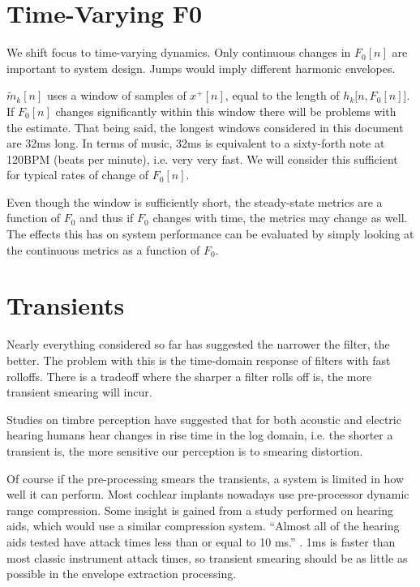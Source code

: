 \documentclass [11pt, proquest,oneside] {ganter_thesis}[2015/03/03]
\begin{document}

\section{Time-Varying F0}

We shift focus to time-varying dynamics.  Only continuous changes in $F_0[n]$ are important to system design.  Jumps would imply different harmonic envelopes.

$\tilde{m}_k[n]$ uses a window of samples of $x^+[n]$, equal to the length of $h_k\big[n,F_0[n]\big]$.  If $F_0[n]$ changes significantly within this window there will be problems with the estimate.  That being said, the longest windows considered in this document are 32ms long.  In terms of music, 32ms is equivalent to a sixty-forth note at 120BPM (beats per minute), i.e. very very fast.  We will consider this sufficient for typical rates of change of $F_0[n]$.

Even though the window is sufficiently short, the steady-state metrics are a function of $F_0$ and thus if $F_0$ changes with time, the metrics may change as well.  The effects this has on system performance can be evaluated by simply looking at the continuous metrics as a function of $F_0$.

\section{Transients}\label{section:transients}

Nearly everything considered so far has suggested the narrower the filter, the better.  The problem with this is the time-domain response of filters with fast rolloffs.  There is a tradeoff where the sharper a filter rolls off is, the more transient smearing will incur.

Studies on timbre perception \cite{kong2011temporal} have suggested that for both acoustic and electric hearing humans hear changes in rise time in the log domain, i.e. the shorter a transient is, the more sensitive our perception is to smearing distortion.

Of course if the pre-processing smears the transients, a system is limited in how well it can perform.  Most cochlear implants nowadays use pre-processor dynamic range compression.  Some insight is gained from a study performed on hearing aids, which would use a similar compression system.  ``Almost all of the hearing aids tested have attack times less than or equal to 10 ms.'' \cite{burnett1977attack}.  1ms is faster than most classic instrument attack times, so transient smearing should be as little as possible in the envelope extraction processing.
\end{document}
